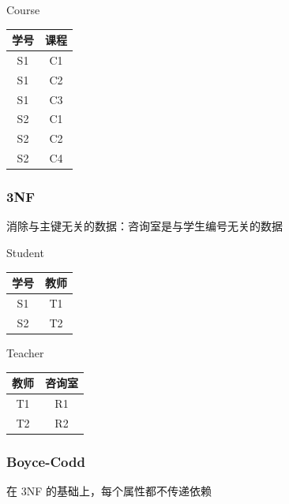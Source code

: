 \documentclass[11pt,journal,compsoc]{IEEEtran}
\begin{document}
Course

\begin{table}[H]
    \centering
    \begin{tabular}{|c|c|}
        \hline
        学号 & 课程 \\
        \hline
        S1 & C1 \\
        \hline
        S1 & C2 \\
        \hline
        S1 & C3 \\
        \hline
        S2 & C1 \\
        \hline
        S2 & C2 \\
        \hline
        S2 & C4 \\
        \hline
    \end{tabular}
\end{table}


\subsubsection{3NF}

消除与主键无关的数据：咨询室是与学生编号无关的数据

Student

\begin{table}[H]
    \centering
    \begin{tabular}{|c|c|}
        \hline
        学号 & 教师 \\
        \hline
        S1 & T1 \\
        S2 & T2 \\
        \hline
    \end{tabular}
\end{table}

Teacher

\begin{table}[H]
    \centering
    \begin{tabular}{|c|c|}
        \hline
        教师 & 咨询室 \\
        \hline
        T1 & R1 \\
        T2 & R2 \\
        \hline
    \end{tabular}
\end{table}


\subsubsection{Boyce-Codd}

在 3NF 的基础上，每个属性都不传递依赖
\end{document}
